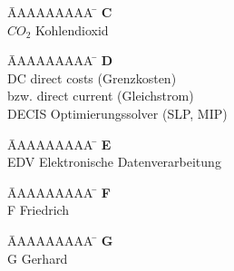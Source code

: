 \documentclass[a4paper, fleqn, headsepline, footsepline, 12pt, parskip=half]{scrartcl}
\begin{document}
\vspace*{-1.5cm}
\begin{tabbing}
	\hspace{0.0cm}  \= AAAAAAAAA \=       \hspace{2cm} \kill
	\>\textbf{C} 	\> \\
	\> $CO_2$ 		\> Kohlendioxid\\
\end{tabbing} 

\vspace*{-1.5cm}
\begin{tabbing}
	\hspace{0.0cm}  \= AAAAAAAAA \=       \hspace{2cm} \kill
	\> \textbf{D} 	\> \\
	\> DC			\> direct costs (Grenzkosten)\\
	\>      		\> bzw. direct current (Gleichstrom)\\
	\> DECIS\footnotemark \> Optimierungssolver (SLP, MIP)\\
\end{tabbing} 

\vspace*{-1.5cm}
\begin{tabbing}
	\hspace{0.0cm}  \= AAAAAAAAA \=       \hspace{2cm} \kill
	\> \textbf{E} 	\> \\
	\> EDV 			\> Elektronische Datenverarbeitung\\
\end{tabbing} 

\vspace*{-1.5cm}
\begin{tabbing}
	\hspace{0.0cm}  \= AAAAAAAAA \=       \hspace{2cm} \kill
	\>\textbf{F} 	\> \\
	\>F 			\>  Friedrich\\
\end{tabbing} 

\vspace*{-1.5cm}
\begin{tabbing}
	\hspace{0.0cm}  \= AAAAAAAAA \=       \hspace{2cm} \kill
	\>\textbf{G} 	\> \\
	\>G 			\>  Gerhard\\
\end{tabbing}
\end{document}
